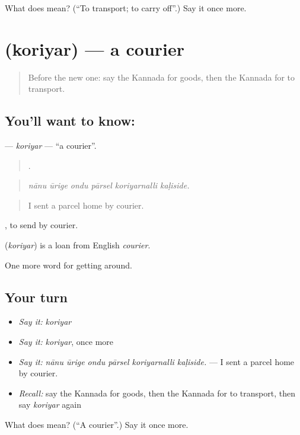 \begin{tcolorbox}[breakable,colback=teal!4,colframe=teal!35!black,title={Before you move on}]
What does  mean? (\textquotedblleft{}To transport; to carry off\textquotedblright{}.) Say it once more.
\end{tcolorbox}
\section[\texorpdfstring{\kn{ಕೊರಿಯರ್} (koriyar)}{ಕೊರಿಯರ್ (koriyar)}]{ (koriyar) — a courier}

\label{lesson:KA-C452-koriyar}



\begin{quote}
Before the new one: say the Kannada for goods, then the Kannada for to transport.
\end{quote}

\subsection*{You'll want to know: }
\textbf{} — \emph{koriyar} — \textquotedblleft{}a courier\textquotedblright{}.

\begin{quote}
     .
\end{quote}

\begin{quote}
\emph{nānu ūrige ondu pārsel koriyarnalli kaḷiside.}
\end{quote}

\begin{quote}
I sent a parcel home by courier.
\end{quote}

 , to send by courier.

\begin{cousinweb}
\textbf{} (\emph{koriyar}) is a loan from English \emph{courier}.
\end{cousinweb}

\begin{grammarlens}[title={What you've built}]
One more word for getting around.
\end{grammarlens}

\subsection*{Your turn}
\begin{itemize}
\raggedright
  \item \emph{Say it:} \emph{koriyar}
  \item \emph{Say it:} \emph{koriyar}, once more
  \item \emph{Say it:} \emph{nānu ūrige ondu pārsel koriyarnalli kaḷiside.} — I sent a parcel home by courier.
  \item \emph{Recall:} say the Kannada for goods, then the Kannada for to transport, then say \emph{koriyar} again
\end{itemize}

\begin{tcolorbox}[breakable,colback=teal!4,colframe=teal!35!black,title={Before you move on}]
What does  mean? (\textquotedblleft{}A courier\textquotedblright{}.) Say it once more.
\end{tcolorbox}
